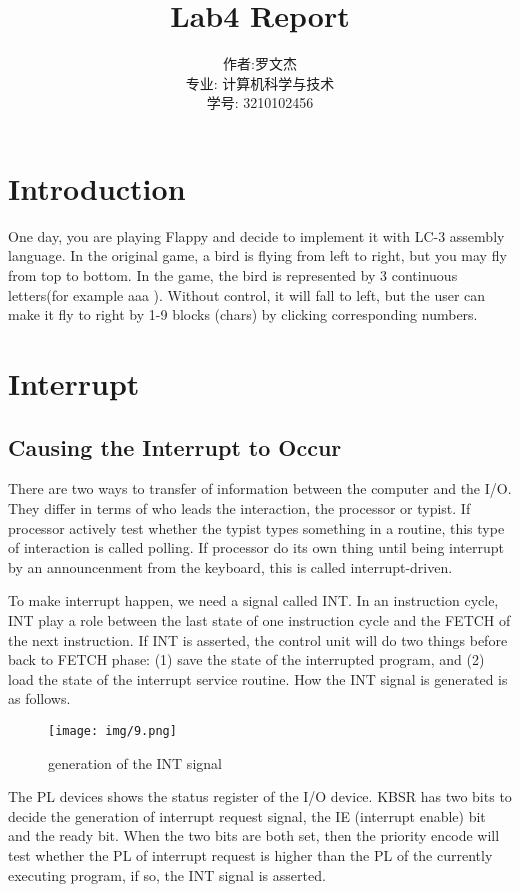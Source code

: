 \documentclass[20pt]{ctexart}
\title{Lab4 Report}
\author{作者:罗文杰\\专业: 计算机科学与技术\\学号: 3210102456}
\date{}
\begin{document}
\maketitle

\section{Introduction}
One day, you are playing Flappy and decide to implement it with LC-3 assembly language. In the 
original game, a bird is flying from left to right, but you may fly from top to bottom. In the game, the bird 
is represented by 3 continuous letters(for example aaa ). Without control, it will fall to left, but the user 
can make it fly to right by 1-9 blocks (chars) by clicking corresponding numbers.

\section{Interrupt}

\subsection{Causing the Interrupt to Occur}
There are two ways to transfer of information between the computer and the I/O. They differ in terms of who leads the interaction, the processor or typist. 
If processor actively test whether the typist types something in a routine, this type of interaction is called polling. If processor do its own thing until being interrupt by an announcenment from the keyboard, this is called interrupt-driven.

To make interrupt happen, we need a signal called INT. In an instruction cycle, INT play a role between the last state of one instruction cycle and the FETCH of the next instruction. If INT is asserted, the control unit will do two things before back to FETCH phase: (1) save the state of the interrupted program, and (2) load the state of the interrupt service routine. How the INT signal is generated is as follows.

\begin{figure}[H]
        \centering
        \texttt{[image: img/9.png]}
        \caption*{generation of the INT signal}
      \end{figure} 
The PL devices shows the status register of the I/O device. KBSR has two bits to decide the generation of interrupt request signal, the IE (interrupt enable) bit and the ready bit. When the two bits are both set, then the priority encode will test whether the PL of interrupt request is higher than the PL of the currently executing program, if so, the INT signal is asserted.
\end{document}
